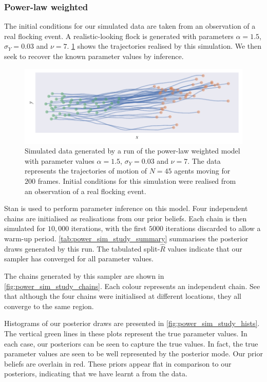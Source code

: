 \subsubsection{Power-law weighted}

The initial conditions for our simulated data are taken from an observation of a real
flocking event. A realistic-looking flock is generated with parameters $\alpha=1.5$,
$\sigma_Y=0.03$ and $\nu=7$.  \cref{fig:power_sim_study} shows the trajectories realised
by this simulation. We then seek to recover the known parameter values by inference.
\begin{figure}[tbp]
  \includegraphics{power_sim.pdf}
  \caption{Simulated data generated by a run of the power-law weighted model with
    parameter values $\alpha=1.5$, $\sigma_Y=0.03$ and $\nu=7$. The data represents the
    trajectories of motion of $N=45$ agents moving for $200$ frames. Initial conditions
    for this simulation were realised from an observation of a real flocking event.}
  \label{fig:power_sim_study}
\end{figure}

Stan is used to perform parameter inference on this model. Four independent chains are
initialised as realisations from our prior beliefs. Each chain is then simulated for
$10,000$ iterations, with the first $5000$ iterations discarded to allow a warm-up period.
\cref{tab:power_sim_study_summary} summarises the posterior draws generated by this run.
The tabulated split-$\widehat{R}$ values indicate that our sampler has converged for all
parameter values.

The chains generated by this sampler are shown in \cref{fig:power_sim_study_chains}. Each
colour represents an independent chain.  See that although the four chains were
initialised at different locations, they all converge to the same region.

Histograms of our posterior draws are presented in \cref{fig:power_sim_study_hists}. The
vertical green lines in these plots represent the true parameter values. In each case, our
posteriors can be seen to capture the true values. In fact, the true parameter values are
seen to be well represented by the posterior mode. Our prior beliefs are overlain in red.
These priors appear flat in comparison to our posteriors, indicating that we have learnt a
from the data.


